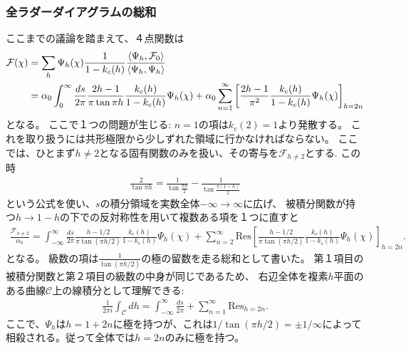 \subsubsection{全ラダーダイアグラムの総和}
ここまでの議論を踏まえて、４点関数は
\begin{align}
	\mathcal{F}(\chi)
	&= \sum_h\Psi_h(\chi)\frac{1}{1 - k_c(h)}
		\frac{\langle \Psi_h, \mathcal{F}_0 \rangle}{\langle \Psi_h, \Psi_h \rangle}\nonumber\\
	&= \alpha_0\int_0^{\infty}\frac{ds}{2\pi}\frac{2h-1}{\pi\tan\pi h}
		\frac{k_c(h)}{1-k_c(h)}\Psi_h(\chi)
	+ \alpha_0\sum_{n=1}^{\infty}\left[
		\frac{2h-1}{\pi^2}\frac{k_c(h)}{1-k_c(h)}\Psi_h(\chi)
	\right]_{h=2n}
	\label{eq:all_sum_of_ladders}
\end{align}
となる。
ここで１つの問題が生じる: $n = 1$の項は$k_c(2) = 1$より発散する。
これを取り扱うには共形極限から少しずれた領域に行かなければならない。
ここでは、ひとまず$h\neq2$となる固有関数のみを扱い、その寄与を$\mathcal{F}_{h\neq2}$とする.
この時
\begin{align}
	\frac{2}{\tan\pi h} = \frac{1}{\tan\frac{\pi h}{2}} - \frac{1}{\tan\frac{\pi(1-h)}{2}}
\end{align}
という公式を使い、$s$の積分領域を実数全体$-\infty\to\infty$に広げ、
被積分関数が持つ$h\to1-h$の下での反対称性を用いて複数ある項を１つに直すと
\begin{align}
	\frac{\mathcal{F}_{h\neq2}}{\alpha_0}
	= \int_{-\infty}^{\infty}\frac{ds}{2\pi}\frac{h - 1/2}{\pi\tan(\pi h / 2)}
		\frac{k_c(h)}{1-k_c(h)}\Psi_h(\chi)
	+ \sum_{n=2}^{\infty}\mathrm{Res}\left[
			\frac{h-1/2}{\pi\tan(\pi h/2)}\frac{k_c(h)}{1-k_c(h)}\Psi_h(\chi)
		\right]_{h=2n}.
\end{align}
となる。
級数の項は$\frac{1}{\tan(\pi h/2)}$の極の留数を走る総和として書いた。
第１項目の被積分関数と第２項目の級数の中身が同じであるため、
右辺全体を複素$h$平面のある曲線$\mathcal{C}$上の線積分として理解できる:
\begin{align}
	\frac{1}{2\pi i}\int_{\mathcal{C}}dh
	= \int_{-\infty}^{\infty}\frac{ds}{2\pi}
	+ \sum_{n=1}^{\infty}\mathrm{Res}_{h=2n}.
\end{align}
ここで、$\Psi_h$は$h = 1 + 2n$に極を持つが、これは$1/\tan(\pi h / 2) = \pm 1/\infty$によって
相殺される。従って全体では$h = 2n$のみに極を持つ。

